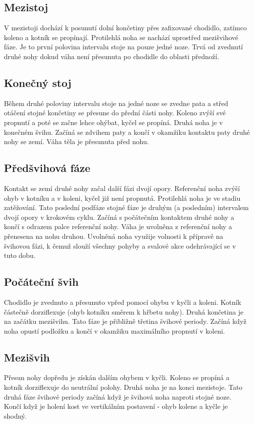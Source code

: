 \subsection{Mezistoj}
V mezistoji dochází k posunutí dolní končetiny přes zafixované chodidlo, zatímco koleno a kotník se propínají. Protilehlá noha se nachází uprostřed mezišvihové fáze. Je to první polovina intervalu stoje na pouze jedné noze. Trvá od zvednutí druhé nohy dokud váha není přesunuta po chodidle do oblasti přednoží. 
\subsection{Konečný stoj}
Během druhé poloviny intervalu stoje na jedné noze se zvedne pata a střed otáčení stojné končetiny se přesune do přední části nohy. Koleno zvýší své propnutí a poté se začne lehce ohýbat, kyčel se propíná. Druhá noha je v konečném švihu. Začíná se zdvihem paty a končí v okamžiku kontaktu paty druhé nohy se zemí. Váha těla je přesunuta před nohu. 
\subsection{Předšvihová fáze}
Kontakt se zemí druhé nohy začal další fázi dvojí opory. Referenční noha zvýší ohyb v kotníku a v koleni, kyčel již není propnutá. Protilehlá noha je ve stadiu zatěžování. Tato poslední podfáze stojné fáze je druhým (a posledním) intervalem dvojí opory v krokovém cyklu. Začíná s počátečním kontaktem druhé nohy a končí s odrazem palce referenční nohy. Váha je uvolněna z referenční nohy a přenesena na nohu druhou. Uvolněná noha využije volnosti k přípravě na švihovou fázi, k čemuž slouží všechny pohyby a svalové akce odehrávající se v tuto dobu.
\subsection{Počáteční švih}
Chodidlo je zvednuto a přesunuto vpřed pomocí ohybu v kyčli a koleni. Kotník částečně dorziflexuje (ohyb kotníku směrem k hřbetu nohy). Druhá končetina je na začátku mezišvihu. Tato fáze je přibližně třetina švihové periody. Začíná když noha opustí podložku a končí v okamžiku maximálního propnutí v koleni.
\subsection{Mezišvih}
Přesun nohy dopředu je získán dalším ohybem v kyčli. Koleno se propíná  a kotník dorziflexuje do neutrální polohy. Druhá noha je na konci mezistoje. Tato druhá fáze švihové periody začíná když je švihová noha  naproti stojné noze. Končí když je holení kost ve vertikálním postavení - ohyb kolene a kyčle je shodný.
